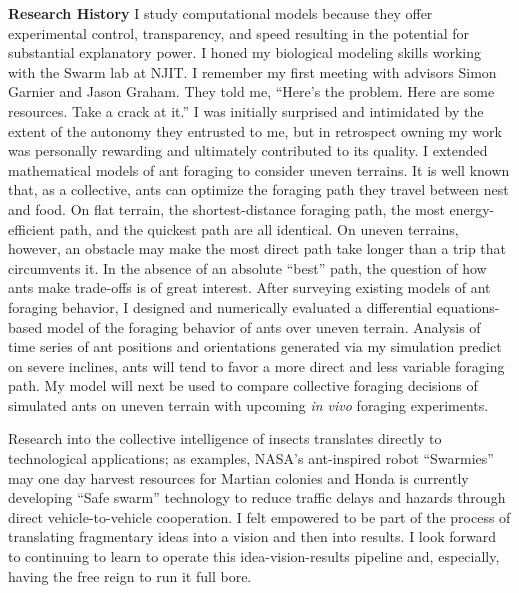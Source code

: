 \textbf{Research History}
I study computational models because they offer experimental control, transparency, and speed resulting in the potential for substantial explanatory power.
I honed my biological modeling skills working with the Swarm lab at NJIT.
I remember my first meeting with advisors Simon Garnier and Jason Graham.
They told me,
``Here's the problem.
Here are some resources.
Take a crack at it.''
I was initially surprised and intimidated by the extent of the autonomy they entrusted to me, but in retrospect owning my work was personally rewarding and ultimately contributed to its quality.
I extended mathematical models of ant foraging to consider uneven terrains.
It is well known that, as a collective, ants can optimize the foraging path they travel between nest and food.
On flat terrain, the shortest-distance foraging path, the most energy-efficient path, and the quickest path are all identical.
On uneven terrains, however, an obstacle may make the most direct path take longer than a trip that circumvents it.
In the absence of an absolute ``best'' path, the question of how ants make trade-offs is of great interest.
After surveying existing models of ant foraging behavior, I designed and numerically evaluated a differential equations-based model of the foraging behavior of ants over uneven terrain.
Analysis of time series of ant positions and orientations generated via my simulation predict on severe inclines, ants will tend to favor a more direct and less variable foraging path. My model will next be used to compare collective foraging decisions of simulated ants on uneven terrain with upcoming \textit{in vivo} foraging experiments.

Research into the collective intelligence of insects translates directly to technological applications;
as examples, NASA's ant-inspired robot ``Swarmies'' may one day harvest resources for Martian colonies and Honda is currently developing ``Safe swarm'' technology to reduce traffic delays and hazards through direct vehicle-to-vehicle cooperation.
I felt empowered to be part of the process of translating fragmentary ideas into a vision and then into results.
I look forward to continuing to learn to operate this idea-vision-results pipeline and, especially, having the free reign to run it full bore.

